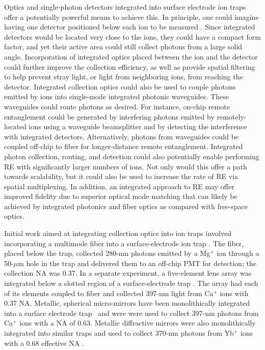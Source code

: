 \documentclass[%
12pt,
 amsmath,amssymb,
]{revtex4-2}
\begin{document}
Optics and single-photon detectors integrated into surface electrode ion traps offer a potentially powerful means to achieve this.  In principle, one could imagine having one detector positioned below each ion to be measured \cite{LekitscheMicrowaveBlueprint2017, MehtaThesis2017}. Since integrated detectors would be located very close to the ions, they could have a compact form factor, and yet their active area could still collect photons from a large solid angle.  Incorporation of integrated optics placed between the ion and the detector could further improve the collection efficiency, as well as provide spatial filtering to help prevent stray light, or light from neighboring ions, from reaching the detector.  Integrated collection optics could also be used to couple photons emitted by ions into single-mode integrated photonic waveguides. These waveguides could route photons as desired.  For instance, on-chip remote entanglement could be generated by interfering photons emitted by remotely-located ions using a waveguide beamsplitter and by detecting the interference with integrated detectors.  Alternatively, photons from waveguides could be coupled off-chip to fiber for longer-distance remote entanglement. Integrated photon collection, routing, and detection could also potentially enable performing RE with significantly larger numbers of ions.  Not only would this offer a path towards scalability, but it could also be used to increase the rate of RE via spatial multiplexing.  In addition, an integrated approach to RE may offer improved fidelity due to superior optical mode matching that can likely be achieved by integrated photonics and fiber optics as compared with free-space optics.

Initial work aimed at integrating collection optics into ion traps involved incorporating a multimode fiber into a surface-electrode ion trap \cite{VanDevenderFiberTrap2010}.  The fiber, placed below the trap, collected 280-nm photons emitted by a Mg$^+$ ion through a 50-$\mu$m hole in the trap and delivered them to an off-chip PMT for detection; the collection NA was 0.37.  In a separate experiment, a five-element lens array was integrated below a slotted region of a surface-electrode trap \cite{ClarkIntegrated5Collection2014}.  The array had each of its elements coupled to fiber and collected 397-nm light from Ca$^+$ ions with 0.37 NA.  Metallic, spherical micro-mirrors have been monolithically integrated into a surface electrode trap~\cite{merrill2011demonstration} and were were used to collect 397-nm photons from Ca$^+$ ions with a NA of 0.63.  Metallic diffractive mirrors were also monolithically integrated into similar traps and used to collect 370-nm photons from Yb$^+$ ions with a 0.68 effective NA \cite{Ghadimi2017}.
\end{document}
